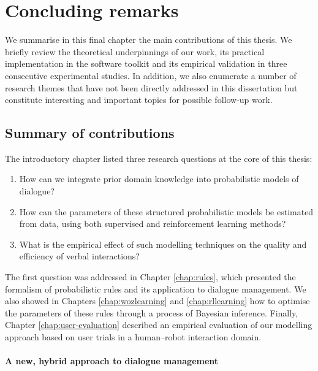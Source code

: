 \chapter{Concluding remarks}
\label{chap:conclusions}

We summarise in this final chapter the main contributions of this thesis.  We briefly review the theoretical underpinnings of our work, its practical implementation in the \opendial{} software toolkit and its empirical validation in three consecutive experimental studies.  In addition, we also enumerate a number of research themes that have not been directly addressed in this dissertation but constitute interesting and important topics for possible follow-up work. 

\section{Summary of contributions}

The introductory chapter listed three research questions at the core of this thesis:
\begin{enumerate}
\item How can we integrate prior domain knowledge into probabilistic models of dialogue?
\item How can the parameters of these structured probabilistic models be estimated from data, using both supervised and reinforcement learning methods?  
\item What is the empirical effect of such modelling techniques on the quality and efficiency of verbal interactions?
\end{enumerate}

The first question was addressed in Chapter \ref{chap:rules}, which presented the formalism of probabilistic rules and its application to dialogue management.  We also showed in Chapters \ref{chap:wozlearning} and \ref{chap:rllearning} how to optimise the parameters of these rules through a process of Bayesian inference.  Finally, Chapter \ref{chap:user-evaluation} described an empirical evaluation of our modelling approach based on user trials in a human--robot interaction domain.


\subsubsection*{A new, hybrid approach to dialogue management}

